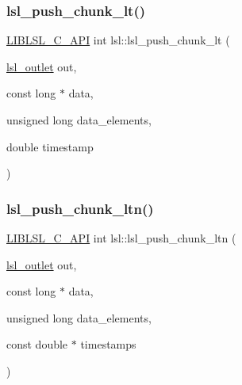 \subsubsection{\texorpdfstring{lsl\+\_\+push\+\_\+chunk\+\_\+lt()}{lsl\_push\_chunk\_lt()}}
{\footnotesize\ttfamily \hyperlink{lsl__cpp_8h_aafd0ef1813e8be84a1420c4f1df64615}{L\+I\+B\+L\+S\+L\+\_\+\+C\+\_\+\+A\+PI} int lsl\+::lsl\+\_\+push\+\_\+chunk\+\_\+lt (\begin{DoxyParamCaption}\item[{\hyperlink{namespacelsl_abcf512b0f66dacf86c10b165995fd50b}{lsl\+\_\+outlet}}]{out,  }\item[{const long $\ast$}]{data,  }\item[{unsigned long}]{data\+\_\+elements,  }\item[{double}]{timestamp }\end{DoxyParamCaption})}

\mbox{\label{namespacelsl_a93cfea6f1ecc01606e6e4f37bba7103f}} 
\subsubsection{\texorpdfstring{lsl\+\_\+push\+\_\+chunk\+\_\+ltn()}{lsl\_push\_chunk\_ltn()}}
{\footnotesize\ttfamily \hyperlink{lsl__cpp_8h_aafd0ef1813e8be84a1420c4f1df64615}{L\+I\+B\+L\+S\+L\+\_\+\+C\+\_\+\+A\+PI} int lsl\+::lsl\+\_\+push\+\_\+chunk\+\_\+ltn (\begin{DoxyParamCaption}\item[{\hyperlink{namespacelsl_abcf512b0f66dacf86c10b165995fd50b}{lsl\+\_\+outlet}}]{out,  }\item[{const long $\ast$}]{data,  }\item[{unsigned long}]{data\+\_\+elements,  }\item[{const double $\ast$}]{timestamps }\end{DoxyParamCaption})}

\mbox{\label{namespacelsl_aa172a29d0976aee8d41306d7b8b53231}} 
